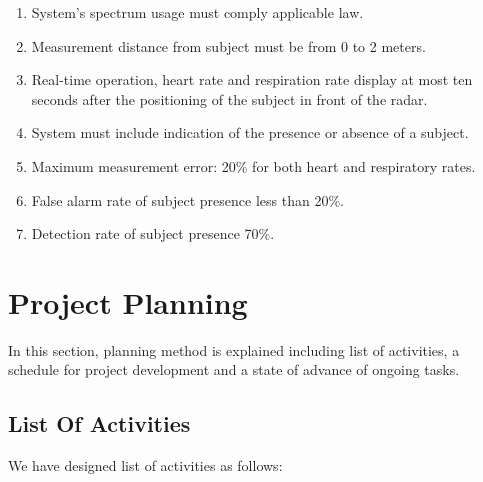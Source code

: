 \documentclass[lettersize,journal]{IEEEtran}
\begin{document}
\begin{enumerate}
    \item System's spectrum usage must comply applicable law.
    \item Measurement distance from subject must be from 0 to 2 meters.
    \item Real-time operation, heart rate and respiration rate display at most ten seconds after the positioning of the subject in front of the radar.
    \item System must include indication of the presence or absence of a subject.
    \item Maximum measurement error: 20\% for both heart and respiratory rates.
    \item False alarm rate of subject presence less than 20\%.
    \item Detection rate of subject presence 70\%.
\end{enumerate}



\section{Project Planning}

In this section, planning method is explained including list of activities, a schedule for project development and a state of advance of ongoing tasks. 

\subsection{List Of Activities}

We have designed list of activities as follows:
\end{document}
